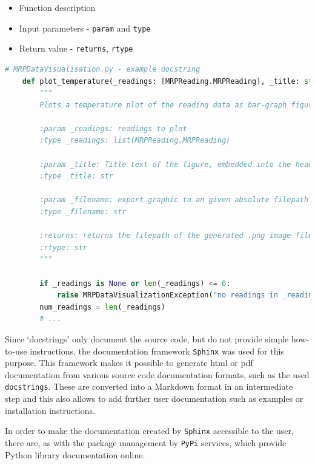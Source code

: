 \begin{itemize}
\tightlist
\item
  Function description
\item
  Input parameters - \passthrough{\lstinline!param!} and
  \passthrough{\lstinline!type!}
\item
  Return value - \passthrough{\lstinline!returns!},
  \passthrough{\lstinline!rtype!}
\end{itemize}

\begin{lstlisting}[language=Python]
    # MRPDataVisualisation.py - example docstring
    def plot_temperature(_readings: [MRPReading.MRPReading], _title: str = '', _filename: str = None, _unit: str = "degree C") -> str:
        """
        Plots a temperature plot of the reading data as bar-graph figure

        :param _readings: readings to plot
        :type _readings: list(MRPReading.MRPReading)

        :param _title: Title text of the figure, embedded into the head
        :type _title: str

        :param _filename: export graphic to an given absolute filepath with .png
        :type _filename: str

        :returns: returns the filepath of the generated .png image file
        :rtype: str
        """

        if _readings is None or len(_readings) <= 0:
            raise MRPDataVisualizationException("no readings in _reading given")
        num_readings = len(_readings)
        # ...
\end{lstlisting}

Since `docstrings' only document the source code, but do not provide
simple how-to-use instructions, the documentation framework
\passthrough{\lstinline!Sphinx!}\cite{SphinxDocumentation} was used
for this purpose. This framework makes it possible to generate
\gls{html} or \gls{pdf} documentation from various source code
documentation formats, such as the used
\passthrough{\lstinline!docstrings!}. These are converted into a
Markdown format in an intermediate step and this also allows to add
further user documentation such as examples or installation
instructions.

In order to make the documentation created by
\passthrough{\lstinline!Sphinx!} accessible to the user, there are, as
with the package management by \passthrough{\lstinline!PyPi!} services,
which provide Python library documentation online.

